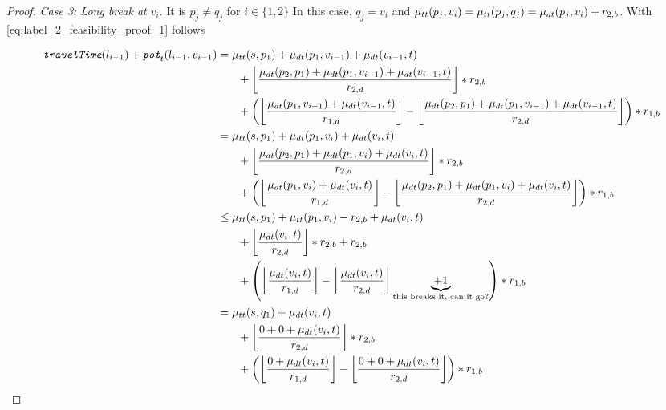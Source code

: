 \begin{proof}
	\emph{Case 3: Long break at $v_i$}. It is $p_j \neq q_j$ for $i \in \{1,2\}$ In this case, $q_j = v_i$ and $\mu_{tt}(p_j,v_i) = \mu_{tt}(p_j,q_j) = \mu_{dt}(p_j,v_i) + r_{2,b}$. With \ref{eq:label_2_feasibility_proof_1} follows

	\begin{align}
		\begin{split}\label{eq:label_2_feasibility_proof_5}
			\concretett(l_{i-1}) + \concretepotential_t(l_{i-1},v_{i-1}) &= \traveltime(s, p_1) + \drivingtime(p_1,v_{i-1}) + \drivingtime(v_{i-1},t)\\
			& \phantom{{}=1} + \floor*{ \frac{\drivingtime(p_2,p_1) + \drivingtime(p_1,v_{i-1}) + \drivingtime(v_{i-1},t)}{\restr_{2,d}} } * \restr_{2,b}\\
			& \phantom{{}=1} + \left( \floor*{ \frac{\drivingtime(p_1,v_{i-1})  + \drivingtime(v_{i-1},t)}{\restr_{1,d}} } - \floor*{ \frac{\drivingtime(p_2,p_1) + \drivingtime(p_1,v_{i-1}) + \drivingtime(v_{i-1},t)}{\restr_{2,d}} }\right) * \restr_{1,b}\\
			&= \traveltime(s, p_1) + \drivingtime(p_1,v_{i}) + \drivingtime(v_{i},t)\\
			& \phantom{{}=1} + \floor*{ \frac{\drivingtime(p_2,p_1) + \drivingtime(p_1,v_{i}) + \drivingtime(v_{i},t)}{\restr_{2,d}} } * \restr_{2,b}\\
			& \phantom{{}=1} + \left( \floor*{ \frac{\drivingtime(p_1,v_{i})  + \drivingtime(v_{i},t)}{\restr_{1,d}} } - \floor*{ \frac{\drivingtime(p_2,p_1) + \drivingtime(p_1,v_{i}) + \drivingtime(v_{i},t)}{\restr_{2,d}} }\right) * \restr_{1,b}\\
			&\le \traveltime(s, p_1) + \traveltime(p_1,v_{i}) - r_{2,b} + \drivingtime(v_{i},t)\\
			& \phantom{{}=1} + \floor*{ \frac{\drivingtime(v_{i},t)}{\restr_{2,d}} } * \restr_{2,b} + \restr_{2,b}\\
			& \phantom{{}=1} + \left( \floor*{ \frac{\drivingtime(v_{i},t)} {\restr_{1,d}} } - \floor*{\frac{\drivingtime(v_{i},t)}{\restr_{2,d}} } \underbrace{+ 1}_\text{this breaks it, can it go?} \right) * \restr_{1,b}\\
			&= \traveltime(s, q_1) + \drivingtime(v_{i},t)\\
			& \phantom{{}=1} + \floor*{ \frac{0 + 0 + \drivingtime(v_{i},t)}{\restr_{2,d}} } * \restr_{2,b}\\
			& \phantom{{}=1} + \left( \floor*{ \frac{0 + \drivingtime(v_{i},t)} {\restr_{1,d}} } - \floor*{\frac{0 + 0 + \drivingtime(v_{i},t)}{\restr_{2,d}} } \right) * \restr_{1,b}\\

\end{split}
\end{align}
\end{proof}

